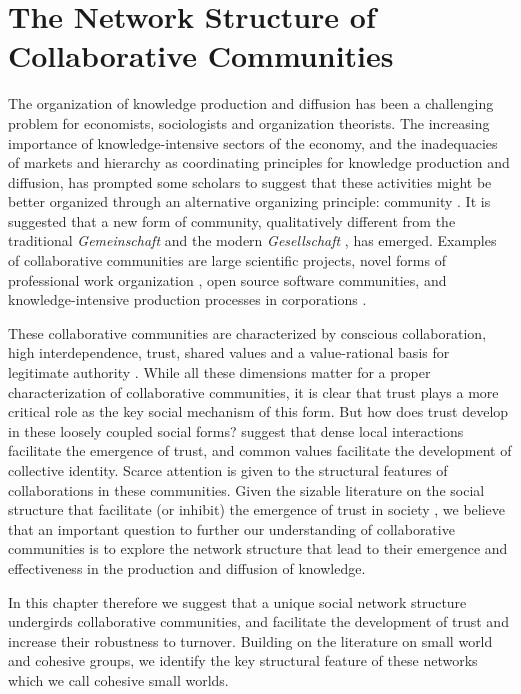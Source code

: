 
\chapter{The Network Structure of Collaborative Communities}

The organization of knowledge production and diffusion has been a challenging problem for economists, sociologists and organization theorists. The increasing importance of knowledge-intensive sectors of the economy, and the inadequacies of markets and hierarchy as coordinating principles for knowledge production and diffusion, has prompted some scholars to suggest that these activities might be better organized through an alternative organizing principle: community \citep{adler:2001}. It is suggested that a new form of community, qualitatively different from the traditional \emph{Gemeinschaft} and the modern \emph{Gesellschaft} \citep{tonnies:1974}, has emerged.  Examples of collaborative communities are large scientific projects, novel forms of professional work organization \citep*{adler:2008}, open source software communities, and knowledge-intensive production processes in corporations \citep{adler:2006}.

These collaborative communities are characterized by conscious collaboration, high interdependence, trust, shared values and a value-rational basis for legitimate authority \citep{adler:2006,adler:2008}. While all these dimensions matter for a proper characterization of collaborative communities, it is clear that trust plays a more critical role as the key social mechanism of this form. But how does trust develop in these loosely coupled social forms? \citet{adler:2006} suggest that dense local interactions facilitate the emergence of trust, and common values facilitate the development of collective identity.  Scarce attention is given to the structural features of collaborations in these communities. Given the sizable literature on the social structure that facilitate (or inhibit) the emergence of trust in society \citep{granovetter:1985,coleman:1988,moody:2003}, we believe that an important question to further our understanding of collaborative communities is to explore the network structure that lead to their emergence and effectiveness in the production and diffusion of knowledge.

In this chapter therefore we suggest that a unique social network structure undergirds collaborative communities, and facilitate the development of trust and increase their robustness to turnover. Building on the literature on small world and cohesive groups, we identify the key structural feature of these networks which we call cohesive small worlds.

